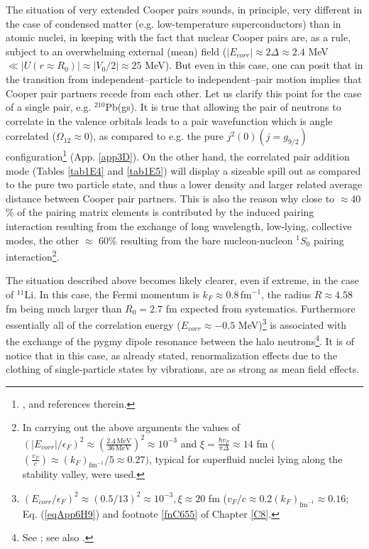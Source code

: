 The situation of very extended Cooper pairs sounds, in principle, very different in the case of condensed matter (e.g. low-temperature superconductors) than in atomic nuclei, in keeping with the fact that nuclear Cooper pairs are, as a rule, subject to an overwhelming external (mean) field ($|E_{corr}|\approx 2\Delta\approx2.4$ MeV $\ll |U(r\approx R_0)|\approx |V_0/2|\approx 25 $ MeV). But even in this case, one can posit that in the transition from independent--particle to independent--pair motion implies that Cooper pair partners recede from each other. Let us clarify this point for the case of a single pair, e.g. $^{210}$Pb(gs). It is true that allowing the pair of neutrons to correlate in the valence orbitals leads to a pair wavefunction which is angle correlated ($\Omega_{12}\approx 0$), as compared to e.g. the pure $j^2(0)(j=g_{9/2})$ configuration\footnote{\label{C4f17}\cite{Bertsch:67}, \cite{Ferreira:84,Matsuo:13} and references therein.} (App. \ref{app3D}). On the other hand, the correlated pair addition mode (Tables \ref{tab1E4} and \ref{tab1E5}) will display a sizeable spill out as compared to the pure two particle state, and thus a lower density and larger related average distance between Cooper pair partners. This is also the reason why close to $\approx 40$\% of the pairing matrix elements is contributed by the induced pairing interaction resulting from the exchange of long wavelength, low-lying, collective modes, the other $\approx$ 60\% resulting from the bare nucleon-nucleon $^1S_0$ pairing interaction\footnote{\label{f17C4} In carrying out the above arguments the values of $(|E_{corr}|/\epsilon_F)^2\approx \left(\frac{2.4 \,\text{MeV}}{36\,\text{MeV}}\right)^2\approx 10^{-3}$ and $\xi=\frac{\hbar v_F}{\pi\Delta}\approx 14$ fm ($(\frac{v_F}{c})\approx (k_F)_{\text{fm}^{-1}}/5\approx 0.27)$, typical for superfluid nuclei lying along the stability valley, were used.}. 


The situation described above becomes likely clearer, even if extreme, in the case of $^{11}$Li. In this case, the Fermi momentum is $k_F\approx 0.8\, \text{fm}^{-1}$, the radius $R\approx 4.58 $fm being much larger than $R_0=2.7$ fm expected from systematics. Furthermore essentially all of the correlation energy ($E_{corr}\approx -0.5$ MeV)\footnote{\label{f18C4} $(E_{corr}/\epsilon_F)^2\approx (0.5/13)^2\approx 10^{-3}, \xi\approx 20 $ fm ($v_F/c\approx0.2(k_F)_{\text{fm}^{-1}}\approx 0.16$; Eq. (\ref{eqApp6H9}) and footnote \ref{fnC655} of Chapter \ref{C8}.}  is associated with the exchange of the  pygmy dipole resonance between the halo neutrons\footnote{See \cite{Barranco:01}; see also \cite{Broglia:19}.}. It is of notice that in this case, as already stated, renormalization effects due to the clothing of single-particle states by vibrations, are as strong as mean field effects.



